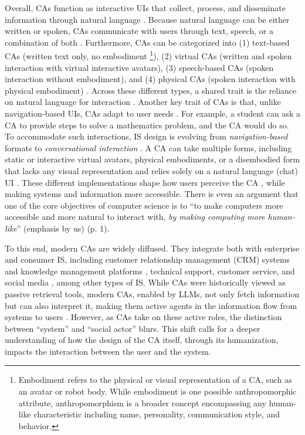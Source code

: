 \documentclass[manuscript,anonymous,sigconf]{acmart}
\begin{document}
Overall, CAs function as interactive UIs that collect, process, and disseminate information through natural language \citep{nguyen2024conversational,mariani2023artificial,pfeuffer2019anthropomorphic}.
Because natural language can be either written or spoken, CAs communicate with users through text, speech, or a combination of both \citep{diederich_conversational_2019}. 
Furthermore, CAs can be categorized into (1) text-based CAs (written text only, no embodiment \footnote{Embodiment refers to the physical or visual representation of a CA, such as an avatar or robot body. While embodiment is one possible anthropomorphic attribute, anthropomorphism is a broader concept encompassing any human-like characteristic including name, personality, communication style, and behavior.}), (2) virtual CAs (written and spoken interaction with virtual interactive avatars), (3) speech-based CAs (spoken interaction without embodiment), and (4) physical CAs (spoken interaction with physical embodiment) \citep{diederich_design_2022}. Across these different types, a shared trait is the reliance on natural language for interaction \citep{diederich_design_2022}. 
Another key trait of CAs is that, unlike navigation-based UIs, CAs adapt to user needs \citep{allouch2021conversational,jain2018evaluating}. For example, a student can ask a CA to provide steps to solve a mathematics problem, and the CA would do so. To accommodate such interactions, IS design is evolving from \textit{navigation-based} formats to \textit{conversational interaction} \citep{finch2023dont,dam2024complete}. A CA can take multiple forms, including static or interactive virtual avatars, physical embodiments, or a disembodied form that lacks any visual representation and relies solely on a natural language (chat) UI \citep{diederich_conversational_2019,diederich_design_2022}. These different implementations shape how users perceive the CA \citep{peter_benefits_2025}, while making systems and information more accessible. There is even an argument that one of the core objectives of computer science is to ``to make computers more accessible and more natural to interact with, \textit{by making computing more human-like}'' (emphasis by us) \citep{peter_benefits_2025} (p. 1).

To this end, modern CAs are widely diffused. They integrate both with enterprise and consumer IS, including customer relationship management (CRM) systems and knowledge management platforms \citep{mariani2023artificial}, technical support, customer service, and social media \citep{diederich_design_2022,schuetzler_impact_2020}, among other types of IS. While CAs were historically viewed as passive retrieval tools, modern CAs, enabled by LLMs, not only fetch information but can also interpret it, making them active agents in the information flow from systems to users \citep{allouch2021conversational}. 
However, as CAs take on these active roles, the distinction between ``system'' and ``social actor'' blurs. This shift calls for a deeper understanding of how the design of the CA itself, through its humanization, impacts the interaction between the user and the system.
\end{document}
